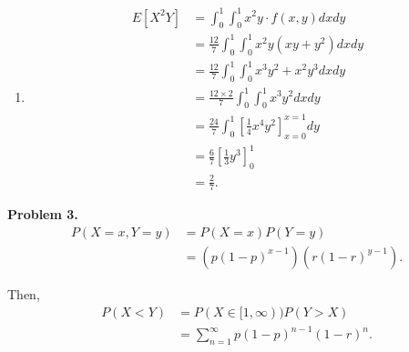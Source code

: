 \documentclass{article}
\begin{document}
\begin{enumerate}[label={(\alph*)}]
    \item 
    \begin{align}
        E[X^2Y] & = \int_{0}^{1}\int_{0}^{1}x^2y\cdot f(x,y)dxdy \\
        & = \frac{12}{7}\int_{0}^{1}\int_{0}^{1}x^2y(xy+y^2) dxdy\\
        & =\frac{12}{7}\int_{0}^{1}\int_{0}^{1}x^3y^2+x^2y^3 dxdy\\
        & = \frac{12\times2}{7}\int_{0}^{1}\int_{0}^{1}x^3y^2dxdy\\
        & = \frac{24}{7}\int_{0}^{1}\left[\frac{1}{4}x^4y^2\right]_{x=0}^{x=1}dy\\
        & = \frac{6}{7}\left[\frac{1}{3}y^3\right]_0^1\\
        & = \frac{2}{7}.
    \end{align}
\end{enumerate}
\bigbreak

\textbf{Problem 3.}
\begin{align}
    P(X=x,Y=y) & = P(X=x)P(Y=y) \\
    & = \left(p(1-p)^{x-1}\right) \left(r(1-r)^{y-1}\right).
\end{align}

Then,
\begin{align}
    P(X<Y) & = P(X\in [1,\infty))P(Y>X) \\
    & = \sum_{n=1}^{\infty}p(1-p)^{n-1}(1-r)^n.
\end{align}
\bigbreak
\end{document}
